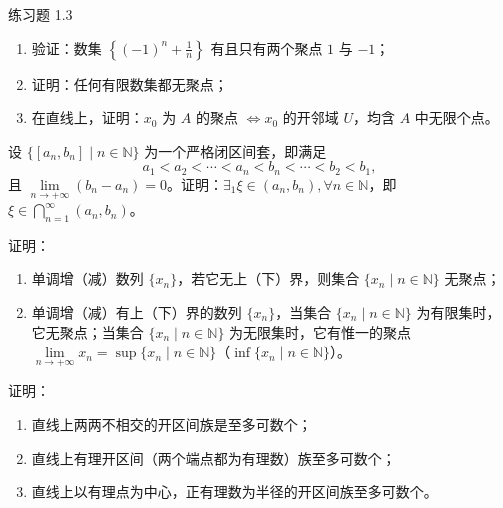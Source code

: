 \begin{exblock}{练习题 1.3}
\item 
\begin{enumerate}
  \item 验证：数集 $\left\{(-1)^n + \frac{1}{n}\right\}$ 有且只有两个聚点 $1$ 与 $-1$；
  \item 证明：任何有限数集都无聚点；
  \item 在直线上，证明：$x_0$ 为 $A$ 的聚点 $\iff x_0$ 的开邻域 $U$，均含 $A$ 中无限个点。
\end{enumerate}

\item 设 $\{[a_n, b_n] \mid n \in \mathbb{N}\}$ 为一个严格闭区间套，即满足
\[
a_1 < a_2 < \cdots < a_n < b_n < \cdots < b_2 < b_1,
\]
且 $\lim\limits_{n\to+\infty} (b_n - a_n) = 0$。证明：$\exists_1 \xi \in (a_n, b_n), \forall n \in \mathbb{N}$，即 $\xi \in \bigcap\limits_{n=1}^\infty (a_n, b_n)$。

\item 证明：
\begin{enumerate}
  \item 单调增（减）数列 $\{x_n\}$，若它无上（下）界，则集合 $\{x_n \mid n \in \mathbb{N}\}$ 无聚点；
  \item 单调增（减）有上（下）界的数列 $\{x_n\}$，当集合 $\{x_n \mid n \in \mathbb{N}\}$ 为有限集时，它无聚点；当集合 $\{x_n \mid n \in \mathbb{N}\}$ 为无限集时，它有惟一的聚点 $\lim\limits_{n\to+\infty} x_n = \sup\{x_n \mid n \in \mathbb{N}\}$（$\inf\{x_n \mid n \in \mathbb{N}\}$）。
\end{enumerate}

\item 证明：
\begin{enumerate}
  \item 直线上两两不相交的开区间族是至多可数个；
  \item 直线上有理开区间（两个端点都为有理数）族至多可数个；
  \item 直线上以有理点为中心，正有理数为半径的开区间族至多可数个。
\end{enumerate}
\end{exblock}

